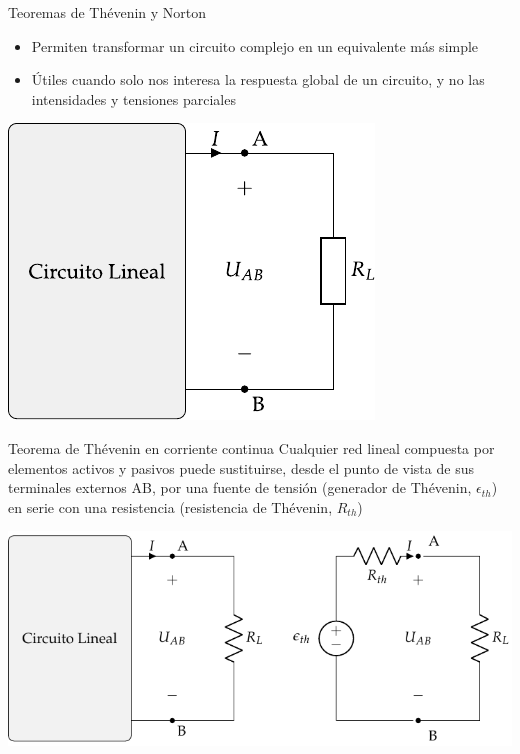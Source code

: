 \documentclass[aspectratio=169, xcolor={usenames,svgnames,dvipsnames}]{beamer}
\begin{document}
\begin{frame}{Teoremas de Thévenin y Norton}

    \vspace{2mm}
    \begin{itemize}
        \item Permiten transformar un circuito complejo en un equivalente \alert{más simple}

        \vspace{2mm}
        \item Útiles cuando solo nos interesa la \alert{respuesta global de un circuito}, y no las intensidades y tensiones parciales        
    \end{itemize}

    \vspace{1mm}
    \begin{center}
    \includegraphics[width=.4\linewidth]{../figs/thevenin_continua_red.pdf}
    \end{center}
\end{frame}


\begin{frame}{Teorema de Thévenin en corriente continua}
    \vspace{3mm}
    Cualquier \alert{red lineal} compuesta por elementos activos y pasivos \alert{puede sustituirse}, desde el punto de vista de sus terminales externos AB, por una \alert{fuente de tensión} (generador de Thévenin, \(\epsilon_{th}\)) en \alert{serie} con una \alert{resistencia} (resistencia de Thévenin, \(R_{th}\))

    \vspace{2mm}
    \begin{center}
        \includegraphics[height=0.6\textheight]{../figs/EquivalenteThevenin_R.pdf}
    \end{center}
\end{frame}
\end{document}
